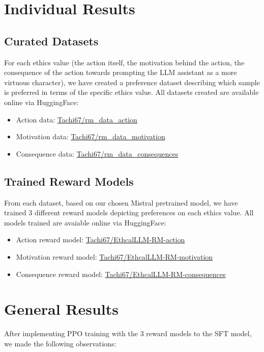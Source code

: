 
\section{Individual Results}
\subsection{Curated Datasets}
For each ethics value (the action itself, the motivation behind the action, the consequence of the action towards prompting the LLM assistant as a more virtuous character), we have created a preference dataset describing which sample is preferred in terms of the specific ethics value. All datasets created are available online via HuggingFace:
\begin{itemize}
    \item Action data: \href{https://huggingface.co/datasets/Tachi67/rm_data_action}{Tachi67/rm\_data\_action}
    \item Motivation data: \href{https://huggingface.co/datasets/Tachi67/rm_data_motivation}{Tachi67/rm\_data\_motivation}
    \item Consequence data: \href{https://huggingface.co/datasets/Tachi67/rm_data_consequences}{Tachi67/rm\_data\_consequences}
\end{itemize}
\subsection{Trained Reward Models}
From each dataset, based on our chosen Mistral pretrained model, we have trained 3 different reward models depicting preferences on each ethics value. All models trained are avaiable online via HuggingFace:

\begin{itemize}
    \item Action reward model: \href{https://huggingface.co/Tachi67/EthcalLLM-RM-action}{Tachi67/EthcalLLM-RM-action}
    \item Motivation reward model: \href{https://huggingface.co/Tachi67/EthcalLLM-RM-motivation}{Tachi67/EthcalLLM-RM-motivation}
    \item Consequence reward model: \href{https://huggingface.co/Tachi67/EthcalLLM-RM-consequences}{Tachi67/EthcalLLM-RM-consequences}
\end{itemize}

\section{General Results}
After implementing PPO training with the 3 reward models to the SFT model, we made the following observations:

